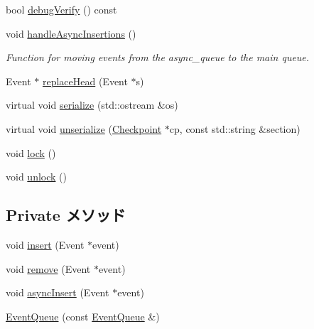 \begin{DoxyCompactItemize}
bool \hyperlink{classEventQueue_a66392764e022762d90e80efbee0500b2}{debugVerify} () const 
\item 
void \hyperlink{classEventQueue_a2f9d0ed8258183804bc764aa3b859f70}{handleAsyncInsertions} ()
\begin{DoxyCompactList}\small\item\em Function for moving events from the async\_\-queue to the main queue. \item\end{DoxyCompactList}\item 
Event $\ast$ \hyperlink{classEventQueue_a1c4b36385e86f178f625f84d95cb6778}{replaceHead} (Event $\ast$s)
\item 
virtual void \hyperlink{classEventQueue_ad6272f80ae37e8331e3969b3f072a801}{serialize} (std::ostream \&os)
\item 
virtual void \hyperlink{classEventQueue_af22e5d6d660b97db37003ac61ac4ee49}{unserialize} (\hyperlink{classCheckpoint}{Checkpoint} $\ast$cp, const std::string \&section)
\end{DoxyCompactItemize}
\begin{Indent}{\bf }\par
{\em \label{_amgrpd41d8cd98f00b204e9800998ecf8427e}
 }\begin{DoxyCompactItemize}
\item 
void \hyperlink{classEventQueue_aa81aed607133209dade63a226818224d}{lock} ()
\item 
void \hyperlink{classEventQueue_a9278be8203e1c42e2619179882ae4403}{unlock} ()
\end{DoxyCompactItemize}
\end{Indent}
\subsection*{Private メソッド}
\begin{DoxyCompactItemize}
\item 
void \hyperlink{classEventQueue_ad8e469f292d876af9e2ec380e8e7e51e}{insert} (Event $\ast$event)
\item 
void \hyperlink{classEventQueue_a3f3ea68ae4a3b85263c9e223efcce2f6}{remove} (Event $\ast$event)
\item 
void \hyperlink{classEventQueue_aadb31d9952f03cb2a934f93cac304153}{asyncInsert} (Event $\ast$event)
\item 
\hyperlink{classEventQueue_aac902b23c2f4ad571d6229b56ea09d0b}{EventQueue} (const \hyperlink{classEventQueue}{EventQueue} \&)
\end{DoxyCompactItemize}
